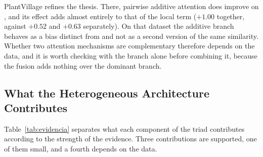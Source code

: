 PlantVillage refines the thesis. There, pairwise additive attention does improve on , and its effect adds almost entirely to that of the local term ($+1.00$ together, against $+0.52$ and $+0.63$ separately). On that dataset the additive branch behaves as a bias distinct from  and not as a second version of the same similarity. Whether two attention mechanisms are complementary therefore depends on the data, and it is worth checking with the branch alone before combining it, because the fusion adds nothing over the dominant branch.

\subsection{What the Heterogeneous Architecture Contributes}
\label{sec:aporte}
Table~\ref{tab:evidencia} separates what each component of the triad contributes according to the strength of the evidence. Three contributions are supported, one of them small, and a fourth depends on the data.

